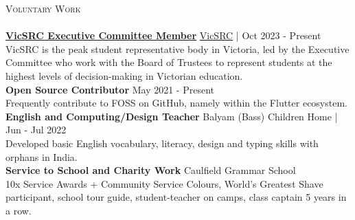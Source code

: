 \documentclass[a4paper]{article}
\newcommand{\lineunder} {
    \vspace*{-8pt} \\
    \hspace*{-18pt} \hrulefill \\
}
\newcommand{\header} [1] {
    {\hspace*{-18pt}\vspace*{6pt} \textsc{#1}}
    \vspace*{-6pt} \lineunder
}
\begin{document}
\header{Voluntary Work}
{\href{https://vicsrc.org.au/about/executive-committee}{\textbf{VicSRC Executive Committee Member}}} \hfill \href{https://vicsrc.org.au/}{VicSRC} | Oct 2023 - Present\\
VicSRC is the peak student representative body in Victoria, led by the Executive Committee who work with the Board of Trustees to represent students at the highest levels of decision-making in Victorian education.\\
\vspace*{2mm}
{\textbf{Open Source Contributor}} \hfill May 2021 - Present\\
Frequently contribute to FOSS on GitHub, namely within the Flutter ecosystem.\\
\vspace*{2mm}
{\textbf{English and Computing/Design Teacher}} \hfill Balyam (Bass) Children Home | Jun - Jul 2022\\
Developed basic English vocabulary, literacy, design and typing skills with orphans in India. \\
\vspace*{2mm}
{\textbf{Service to School and Charity Work}} \hfill Caulfield Grammar School\\
10x Service Awards + Community Service Colours, World's Greatest Shave participant, school tour guide, student-teacher on camps, class captain 5 years in a row.\\
\vspace*{2mm}
\end{document}

